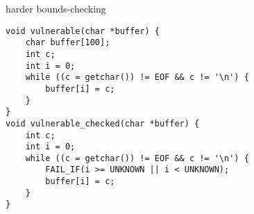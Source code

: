\begin{frame}[fragile,label=addBoundsHarder]{harder bounds-checking}
    \lstset{language=C,style=smaller}
\begin{lstlisting}
void vulnerable(char *buffer) {
    char buffer[100];
    int c;
    int i = 0;
    while ((c = getchar()) != EOF && c != '\n') {
        buffer[i] = c;
    }
}
void vulnerable_checked(char *buffer) {
    int c;
    int i = 0;
    while ((c = getchar()) != EOF && c != '\n') {
        FAIL_IF(i >= UNKNOWN || i < UNKNOWN);
        buffer[i] = c;
    }
}
\end{lstlisting}
\end{frame}
